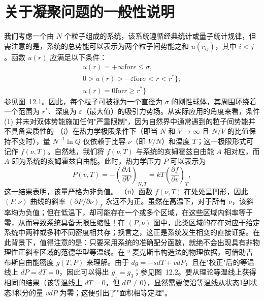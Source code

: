 \section{关于凝聚问题的一般性说明}\label{ux5173ux4e8eux51ddux805aux95eeux9898ux7684ux4e00ux822cux6027ux8bf4ux660e}
我们考虑一个由 \(N\) 个粒子组成的系统，该系统遵循经典统计或量子统计规律，但需注意的是，系统的总势能可以表示为两个粒子间势能之和 \(u(r_{ij})\)，其中 \(i < j\)。函数 \(u(r)\) 应满足以下条件：
\begin{equation}\tag{12.1.1}\label{eq:12.1.1}
\begin{array}{r} { u ( r ) = + \infty  \mathrm { f o r }  r \leq \sigma , } \\{ 0 > u ( r ) > - \varepsilon  \mathrm { f o r }  \sigma < r < r ^{*} \biggr \} ; } \\{ u ( r ) = 0  \mathrm { f o r }  r \geq r ^{*} \biggr \} } \end{array}
\end{equation}
参见图~12.1。因此，每个粒子可被视为一个直径为 \(\sigma\) 的刚性球体，其周围环绕着一个范围为 \(r^{*}\)、深度为 \(\varepsilon\)（最大值）的吸引力势场。从实际应用的角度来看，条件 (1) 并未对双体势能施加任何"严重限制"，因为自然界中通常遇到的粒子间势能并不具备实质性的
（i）在热力学极限条件下（即当 \(N\) 和 \(V \to \infty\) 且 \(N/V\) 的比值保持不变时），量 \(N^{-1} \ln Q\) 仅依赖于比容 \(\nu\)（即 \(V/N\)）和温度 \(T\)；这一极限形式可记作 \(f(\nu,T)\)。自然地，我们将 \(f(\nu,T)\) 与系统的亥姆霍兹自由能 \(A\) 相对应，而 \(A\) 即为系统的亥姆霍兹自由能。此时，热力学压力 \(P\) 可以表示为
\begin{equation}\tag{12.1.2}\label{eq:12.1.2}
P ( v , T ) = - \left( \frac { \partial A } { \partial V } \right) _ { N , T } = k T \left( \frac { \partial f } { \partial v } \right) _ { T } ,
\end{equation}
这一结果表明，该量严格为非负值。
（ii）函数 \(f(\nu,T)\) 在处处呈凹形，因此 \((P,\nu)\) 曲线的斜率 \((\partial P/\partial\nu)_T\) 永远不为正。虽然在高温下，对于所有 \(\nu\)，该斜率均为负值；但在低温下，却可能存在一个或多个区域，在这些区域内斜率等于零，从而导致系统具备无限压缩性！在 \((P,\nu)\) 图中，此类区域的存在对应于给定系统中两种或多种不同密度相共存；换言之，这正是系统发生相变的直接证据。在此背景下，值得注意的是：只要采用系统的准确配分函数，就绝不会出现具有非物理性正斜率区域的范德华型等温线。在
³ 麦克斯韦构造法的物理依据，可借助吉布斯自由能密度 \(g(T,P)\) 来理解。由于 \(dg = -sdT + vdP\)，且在"校正"后的等温线上 \(dP =dT = 0\)，因此可以得出 \(g_{1} = g_{3}\)；参见图~12.2。要从理论等温线上获得相同的结果（该等温线上 \(dT = 0\)，但 \(dP \neq 0\)），显然需要使沿等温线从状态1到状态3积分的量 \(vdP\) 为零；这便引出了"面积相等定理"。
